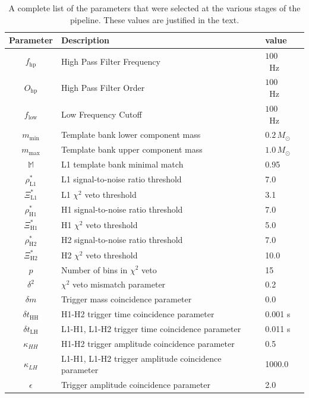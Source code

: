 \begin{table}[p]
\begin{tabular}{cllr}
Parameter & Description  & value \\
\hline 
$f_\mathrm{hp}$ & High Pass Filter Frequency  & $100$~Hz \\
$O_\mathrm{hp}$ & High Pass Filter Order  & $100$~Hz \\
$f_\mathrm{low}$ & Low Frequency Cutoff  & $100$~Hz \\
$m_\mathrm{min}$ & Template bank lower component mass  & $0.2\,M_\odot$ \\
$m_\mathrm{max}$ & Template bank upper component mass  & $1.0\,M_\odot$ \\
$\mathbb{M}$ & L1 template bank minimal match  & 0.95 \\
$\rho^\ast_\mathrm{L1}$ & L1 signal-to-noise ratio threshold & 7.0 \\
$\Xi^\ast_\mathrm{L1}$ & L1 $\chi^2$ veto threshold & 3.1 \\
$\rho^\ast_\mathrm{H1}$ & H1 signal-to-noise ratio threshold & 7.0 \\
$\Xi^\ast_\mathrm{H1}$ & H1 $\chi^2$ veto threshold & 5.0 \\
$\rho^\ast_\mathrm{H2}$ & H2 signal-to-noise ratio threshold & 7.0 \\
$\Xi^\ast_\mathrm{H2}$ & H2 $\chi^2$ veto threshold & 10.0 \\
$p$ & Number of bins in $\chi^2$ veto & 15 \\
$\delta^2$ & $\chi^2$ veto mismatch parameter & 0.2 \\
$\delta m$ & Trigger mass coincidence parameter & 0.0 \\
$\delta t_\mathrm{HH}$ & H1-H2 trigger time coincidence parameter & 0.001 s \\
$\delta t_\mathrm{LH}$ & L1-H1, L1-H2 trigger time coincidence parameter & 0.011 s \\
$\kappa_{HH}$ & H1-H2 trigger amplitude coincidence parameter & 0.5 \\
$\kappa_{LH}$ & L1-H1, L1-H2 trigger amplitude coincidence parameter & 1000.0 \\
$\epsilon$ & Trigger amplitude coincidence parameter & 2.0
\end{tabular}
\caption[Pipeline Parameters used in S2 BBHMACHO Search]{%
\label{t:ifo_params}%
A complete list of the parameters that were selected at the various
stages of the pipeline. These values are justified in the text.
}
\end{table}

